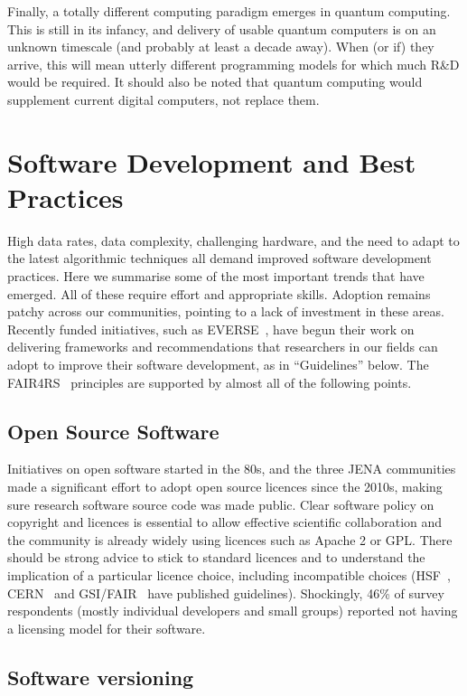 Finally, a totally different computing paradigm emerges in quantum computing. This is still in its infancy, and delivery of usable quantum computers is on an unknown timescale (and probably at least a decade away). When (or if) they arrive, this will mean utterly different programming models for which much R\&D would be required. It should also be noted that quantum computing would supplement current digital computers, not replace them.


\section{Software Development and Best Practices}

High data rates, data complexity, challenging hardware, and the need to adapt to the latest algorithmic techniques all demand improved software development practices. Here we summarise some of the most important trends that have emerged. All of these require effort and appropriate skills. Adoption remains patchy across our communities, pointing to a lack of investment in these areas. Recently funded initiatives, such as EVERSE~\cite{EVERSE}, have begun their work on delivering frameworks and recommendations that researchers in our fields can adopt to improve their software development, as in ``Guidelines'' below. The FAIR4RS~\cite{Barker2022} principles are supported by almost all of the following points.

\subsection{Open Source Software}

Initiatives on open software started in the 80s, and the three JENA communities made a significant effort to adopt open source licences since the 2010s, making sure research software source code was made public. Clear software policy on copyright and licences is essential to allow effective scientific collaboration and the community is already widely using licences such as Apache 2 or GPL. There should be strong advice to stick to standard licences and to understand the implication of a particular licence choice, including incompatible choices (HSF~\cite{jouvin_2016_1469636}, CERN~\cite{Fluckiger:1482206} and GSI/FAIR~\cite{GSIFAIROpenSource} have published guidelines). Shockingly, 46\% of survey respondents (mostly individual developers and small groups) reported not having a licensing model for their software.

\subsection{Software versioning}

